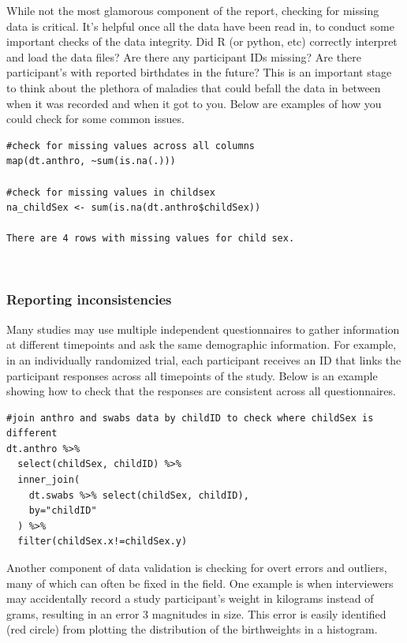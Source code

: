 \documentclass[
]{book}
\begin{document}
While not the most glamorous component of the report, checking for missing data is critical. It's helpful once all the data have been read in, to conduct some important checks of the data integrity. Did R (or python, etc) correctly interpret and load the data files? Are there any participant IDs missing? Are there participant's with reported birthdates in the future? This is an important stage to think about the plethora of maladies that could befall the data in between when it was recorded and when it got to you. Below are examples of how you could check for some common issues.

\begin{verbatim}
#check for missing values across all columns
map(dt.anthro, ~sum(is.na(.)))

#check for missing values in childsex
na_childSex <- sum(is.na(dt.anthro$childSex))

There are 4 rows with missing values for child sex.
\end{verbatim}

\(~\)

\subsubsection{Reporting inconsistencies}\label{reporting-inconsistencies}

Many studies may use multiple independent questionnaires to gather information at different timepoints and ask the same demographic information. For example, in an individually randomized trial, each participant receives an ID that links the participant responses across all timepoints of the study. Below is an example showing how to check that the responses are consistent across all questionnaires.

\begin{verbatim}
#join anthro and swabs data by childID to check where childSex is different
dt.anthro %>%
  select(childSex, childID) %>%
  inner_join(
    dt.swabs %>% select(childSex, childID),
    by="childID"
  ) %>%
  filter(childSex.x!=childSex.y)
\end{verbatim}

Another component of data validation is checking for overt errors and outliers, many of which can often be fixed in the field. One example is when interviewers may accidentally record a study participant's weight in kilograms instead of grams, resulting in an error 3 magnitudes in size. This error is easily identified (red circle) from plotting the distribution of the birthweights in a histogram.
\end{document}
